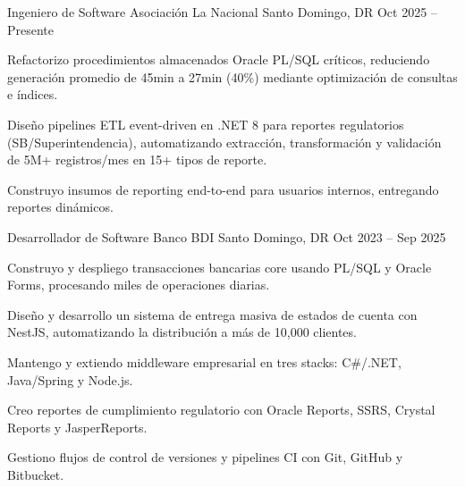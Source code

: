 \documentclass[]{awesome-cv}
\begin{document}
\begin{cventries}
	\cventry
	{Ingeniero de Software}
	{Asociaci\'{o}n La Nacional}
	{Santo Domingo, DR}
	{Oct 2025 -- Presente}
	{\begin{cvitems}
		\item {Refactorizo procedimientos almacenados Oracle PL/SQL cr\'{i}ticos, reduciendo generaci\'{o}n promedio de 45min a 27min (40\%) mediante optimizaci\'{o}n de consultas e \'{i}ndices.}
		\item {Dise\~{n}o pipelines ETL event-driven en .NET 8 para reportes regulatorios (SB/Superintendencia), automatizando extracci\'{o}n, transformaci\'{o}n y validaci\'{o}n de 5M+ registros/mes en 15+ tipos de reporte.}
    \item {Construyo insumos de reporting end-to-end para usuarios internos, entregando reportes din\'{a}micos.} 
		\end{cvitems}}

	\cventry
	{Desarrollador de Software}
	{Banco BDI}
	{Santo Domingo, DR}
	{Oct 2023 -- Sep 2025}
	{\begin{cvitems}
		\item {Construyo y despliego transacciones bancarias core usando PL/SQL y Oracle Forms, procesando miles de operaciones diarias.}
		\item {Dise\~{n}o y desarrollo un sistema de entrega masiva de estados de cuenta con NestJS, automatizando la distribuci\'{o}n a m\'{a}s de 10,000 clientes.}
		\item {Mantengo y extiendo middleware empresarial en tres stacks: C\#/.NET, Java/Spring y Node.js.}
		\item {Creo reportes de cumplimiento regulatorio con Oracle Reports, SSRS, Crystal Reports y JasperReports.}
		\item {Gestiono flujos de control de versiones y pipelines CI con Git, GitHub y Bitbucket.}
		\end{cvitems}}
\end{cventries}
\end{document}
